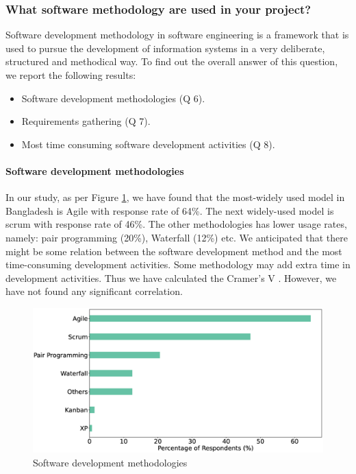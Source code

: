 \subsubsection{What software methodology are used in your project?}
\label{methodology}

Software development methodology in software engineering is a framework that is used to pursue the development of information systems in a very deliberate, structured and methodical way. To find out the overall answer of this question, we report the following results:

\begin{itemize}
\item Software development methodologies (Q 6).
\item Requirements gathering (Q 7).
\item Most time consuming software development activities (Q 8).
\end{itemize}


\paragraph{Software development methodologies}
In our study, as per Figure \ref{fig:methodologies}, we have found that the most-widely used model in Bangladesh is Agile with response rate of 64\%. The next widely-used model is scrum with response rate of 46\%. The other methodologies has lower usage rates, namely: pair programming (20\%), Waterfall (12\%) etc. We anticipated that there might be some relation between the software development method and the most time-consuming development activities.  Some methodology may add extra time in development activities. Thus we have calculated the Cramer's V \cite{Cramer1946}. However, we have not found any significant correlation.

\begin{figure}[h]
\centering
  \includegraphics[scale=0.18]{Figures/Respondents_Methodology}
  \caption{Software development methodologies}
  \label{fig:methodologies}
\end{figure}


